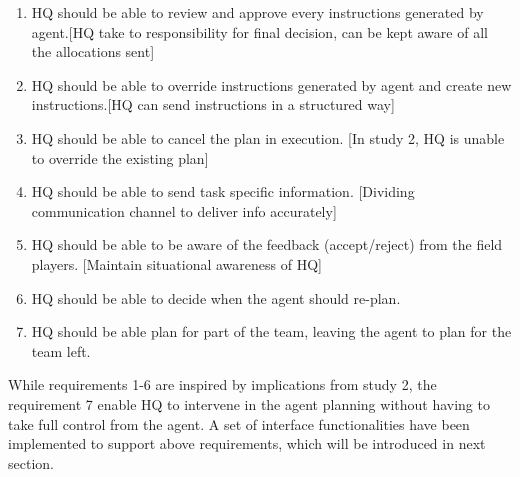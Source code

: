 \begin{enumerate}
\item HQ should be able to review and approve every instructions generated by agent.[HQ take to responsibility for final decision, can be kept aware of all the allocations sent]
\item HQ should be able to override instructions generated by agent and create new instructions.[HQ can send instructions in a structured way]
\item HQ should be able to cancel the plan in execution. [In study 2, HQ is unable to override the existing plan]
\item HQ should be able to send task specific information. [Dividing communication channel to deliver info accurately]
\item HQ should be able to be aware of the feedback (accept/reject) from the field players. [Maintain situational awareness of HQ]
\item HQ should be able to decide when the agent should re-plan. 
\item HQ should be able plan for part of the team, leaving the agent to plan for the team left. 
\end{enumerate}

While requirements 1-6 are inspired by implications from study 2, the requirement 7 enable HQ to intervene in the agent planning without having to take full control from the agent. A set of interface functionalities have been implemented to support above requirements, which will be introduced in next section. \\

 




